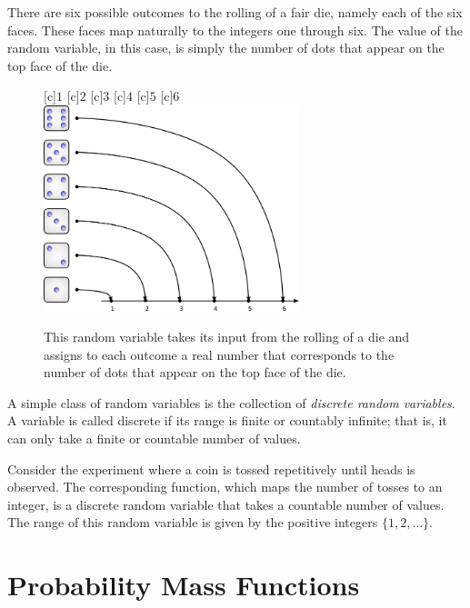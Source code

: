 \begin{example}
There are six possible outcomes to the rolling of a fair die, namely each of the six faces.
These faces map naturally to the integers one through six.
The value of the random variable, in this case, is simply the number of dots that appear on the top face of the die.

\begin{figure}[ht]
\begin{center}
\begin{psfrags}
[c]{$1$}
[c]{$2$}
[c]{$3$}
[c]{$4$}
[c]{$5$}
[c]{$6$}
\includegraphics[height=5.99cm]{Figures/5chapter/rvdices}
\caption{This random variable takes its input from the rolling of a die and assigns to each outcome a real number that corresponds to the number of dots that appear on the top face of the die.}
\end{psfrags}
\end{center}
\end{figure}
\end{example}

A simple class of random variables is the collection of \emph{discrete random variables}. 
A variable is called discrete if its range is finite or countably infinite; that is, it can only take a finite or countable number of values.

\begin{example}
Consider the experiment where a coin is tossed repetitively until heads is observed.
The corresponding function, which maps the number of tosses to an integer, is a discrete random variable that takes a countable number of values.
The range of this random variable is given by the positive integers $\{1, 2, \ldots \}$.
\end{example}

\section{Probability Mass Functions}

